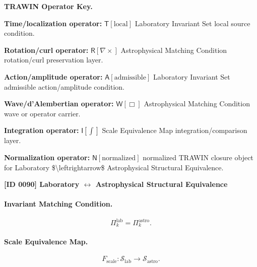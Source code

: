 \par\vspace{0.45\baselineskip}
\noindent\begin{minipage}[t]{\linewidth}
\begingroup
\small
\raggedright
\textbf{TRAWIN Operator Key.}\par
\noindent\textbf{Time/localization operator:} $\mathsf{T}\!\left[\mathrm{local}\right]$ Laboratory Invariant Set local source condition.\par
\noindent\textbf{Rotation/curl operator:} $\mathsf{R}\!\left[\nabla\times\right]$ Astrophysical Matching Condition rotation/curl preservation layer.\par
\noindent\textbf{Action/amplitude operator:} $\mathsf{A}\!\left[\mathrm{admissible}\right]$ Laboratory Invariant Set admissible action/amplitude condition.\par
\noindent\textbf{Wave/d'Alembertian operator:} $\mathsf{W}\!\left[\Box\right]$ Astrophysical Matching Condition wave or operator carrier.\par
\noindent\textbf{Integration operator:} $\mathsf{I}\!\left[\int\right]$ Scale Equivalence Map integration/comparison layer.\par
\noindent\textbf{Normalization operator:} $\mathsf{N}\!\left[\mathrm{normalized}\right]$ normalized TRAWIN closure object for Laboratory \$\textbackslash{}leftrightarrow\$ Astrophysical Structural Equivalence.\par
\endgroup
\end{minipage}

\clearpage
\noindent\textbf{[ID 0090] Laboratory $\leftrightarrow$ Astrophysical Structural Equivalence}\par
\vspace{0.35em}
\paragraph{Invariant Matching Condition.}
\begin{equation}
\Pi_k^{\mathrm{lab}}
=
\Pi_k^{\mathrm{astro}} .
\end{equation}

\paragraph{Scale Equivalence Map.}
\begin{equation}
F_{\mathrm{scale}}:
\mathcal{S}_{\mathrm{lab}}
\longrightarrow
\mathcal{S}_{\mathrm{astro}} .
\end{equation}

